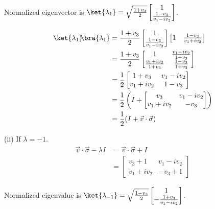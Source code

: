 \documentclass[10pt]{book}
\newcommand{\kb}[1]{\ket{#1}\hspace{-1mm} \bra{#1}} %
\begin{document}
	Normalized eigenvector is $\ket{\lambda_1} = \sqrt{ \frac{1+v_3}{2 }} \begin{bmatrix}
		1 \\
		\frac{1-v_3}{v_1 - iv_2}
	\end{bmatrix} $.
	
	\begin{equation}
\begin{aligned}
		\kb{\lambda_1} &= \frac{1+v_3}{2 } \begin{bmatrix}
			1 \\
			\frac{1-v_3}{v_1 - iv_2}
		\end{bmatrix}
		\begin{bmatrix}
			1 &
			\frac{1-v_3}{v_1 + iv_2}
		\end{bmatrix}\\
		&=
		\frac{1+v_3}{2 } \begin{bmatrix}
			1 & \frac{v_1 - iv_2}{1 + v_3} \\
			\frac{v_1 + iv_2}{1 + v_3} & \frac{1-v_3}{1+v_3}
		\end{bmatrix} \\
		&=
		\frac{1}{2} \begin{bmatrix}
			1+v_3 & v_1 - iv_2 \\
			v_1 + iv_2 & 1 - v_3
		\end{bmatrix} \\
		&=
		\frac{1}{2} \left( I + \begin{bmatrix}
			v_3 & v_1 - iv_2 \\
			v_1 + iv_2 & - v_3
		\end{bmatrix} \right) \\
		&=
		\frac{1}{2} (I + \vec{v} \cdot \vec{\sigma} )
	\end{aligned}
\end{equation}
	
	
	
	(ii) If $\lambda = -1$.
	\begin{equation}
\begin{aligned}
		\vec{v} \cdot \vec{\sigma}  - \lambda I &= \vec{v} \cdot \vec{\sigma}  + I\\
		&= \begin{bmatrix}
			v_3 + 1 & v_1 - i v_2 \\
			v_1 + i v_2 & - v_3 + 1
		\end{bmatrix}
	\end{aligned}
\end{equation}
	
	Normalized eigenvalue is $\ket{\lambda_{-1}} = \sqrt{ \frac{1-v_3}{2 }} \begin{bmatrix}
		1 \\
		- \frac{1+v_3}{v_1 - iv_2}
	\end{bmatrix} $.
	
\end{document}
